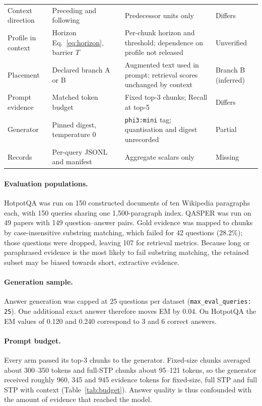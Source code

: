 \documentclass[10pt,a4paper]{article}
\begin{document}
\begin{table}[!htbp]
\begin{tabularx}{\textwidth}{@{}>{\raggedright\arraybackslash}p{}>{\raggedright\arraybackslash}p{}>{\raggedright\arraybackslash}X>{\raggedright\arraybackslash}p{}@{}}
Context direction & Preceding and following & Predecessor units only & Differs \\
Profile in context & Horizon Eq.~\eqref{eq:horizon}, barrier $T$ & Per-chunk horizon and threshold; dependence on profile not released & Unverified \\
Placement & Declared branch A or B & Augmented text used in prompt; retrieval scores unchanged by context & Branch B (inferred) \\
Prompt evidence & Matched token budget & Fixed top-3 chunks; Recall at top-5 & Differs \\
Generator & Pinned digest, temperature 0 & \texttt{phi3:mini} tag; quantisation and digest unrecorded & Partial \\
Records & Per-query JSONL and manifest & Aggregate scalars only & Missing \\
\bottomrule
\end{tabularx}
\end{table}

\paragraph{Evaluation populations.} HotpotQA was run on 150 constructed documents of ten Wikipedia paragraphs each, with 150 queries sharing one 1,500-paragraph index. QASPER was run on 49 papers with 149 question--answer pairs. Gold evidence was mapped to chunks by case-insensitive substring matching, which failed for 42 questions (28.2\%); those questions were dropped, leaving 107 for retrieval metrics. Because long or paraphrased evidence is the most likely to fail substring matching, the retained subset may be biased towards short, extractive evidence.

\paragraph{Generation sample.} Answer generation was capped at 25 questions per dataset (\texttt{max\_eval\_queries: 25}). One additional exact answer therefore moves EM by 0.04. On HotpotQA the EM values of 0.120 and 0.240 correspond to 3 and 6 correct answers.

\paragraph{Prompt budget.} Every arm passed its top-3 chunks to the generator. Fixed-size chunks averaged about 300--350 tokens and full-STP chunks about 95--121 tokens, so the generator received roughly 960, 345 and 945 evidence tokens for fixed-size, full STP and full STP with context (Table~\ref{tab:budget}). Answer quality is thus confounded with the amount of evidence that reached the model.
\end{document}

